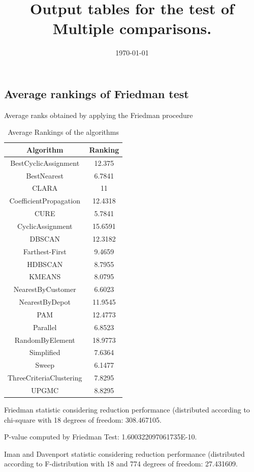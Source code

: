 \documentclass[a4paper,10pt]{article}
\title{Output tables for the test of Multiple comparisons.}
\author{}
\date{\today}
\begin{document}
\begin{landscape}
\pagestyle{empty}
\maketitle
\thispagestyle{empty}
\section{Average rankings of Friedman test}



Average ranks obtained by applying the Friedman procedure

\begin{table}[!htp]
\centering
\begin{tabular}{|c|c|}\hline
Algorithm&Ranking\\\hline
BestCyclicAssignment & 12.375\\
BestNearest & 6.7841\\
CLARA & 11\\
CoefficientPropagation & 12.4318\\
CURE & 5.7841\\
CyclicAssignment & 15.6591\\
DBSCAN & 12.3182\\
Farthest-First & 9.4659\\
HDBSCAN & 8.7955\\
KMEANS & 8.0795\\
NearestByCustomer & 6.6023\\
NearestByDepot & 11.9545\\
PAM & 12.4773\\
Parallel & 6.8523\\
RandomByElement & 18.9773\\
Simplified & 7.6364\\
Sweep & 6.1477\\
ThreeCriteriaClustering & 7.8295\\
UPGMC & 8.8295\\
\hline
\end{tabular}
\caption{Average Rankings of the algorithms}
\end{table}

Friedman statistic considering reduction performance (distributed according to chi-square with 18 degrees of freedom: 308.467105.

P-value computed by Friedman Test: 1.600322097061735E-10.\newline

Iman and Davenport statistic considering reduction performance (distributed according to F-distribution with 18 and 774 degrees of freedom: 27.431609.


\end{landscape}
\end{document}
